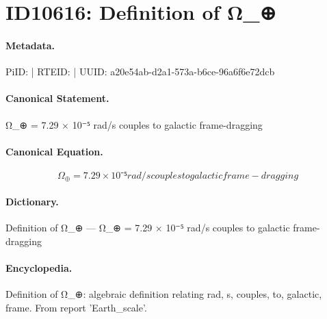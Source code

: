 \section*{ID10616: Definition of Ω\_⊕}
\paragraph{Metadata.}
PiID:  | RTEID:  | UUID: a20e54ab-d2a1-573a-b6ce-96a6f6e72dcb

\paragraph{Canonical Statement.}
Ω\_⊕ = 7.29 × 10⁻⁵ rad/s couples to galactic frame-dragging

\paragraph{Canonical Equation.}
\[
Ω_⊕ = 7.29 × 10⁻⁵ rad/s couples to galactic frame-dragging
\]

\paragraph{Dictionary.}
Definition of Ω\_⊕ — Ω\_⊕ = 7.29 × 10⁻⁵ rad/s couples to galactic frame-dragging

\paragraph{Encyclopedia.}
Definition of Ω\_⊕: algebraic definition relating rad, s, couples, to, galactic, frame. From report 'Earth\_scale'.
